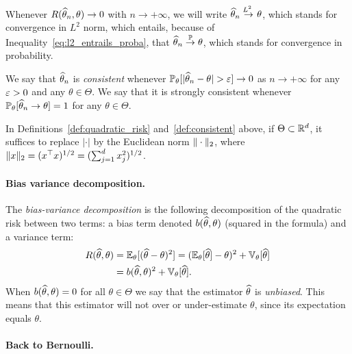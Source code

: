 Whenever $R(\widehat \theta_n, \theta) \rightarrow 0$ with $n \rightarrow +\infty$, we will write $\widehat \theta_n \overset{\text{$L^2$\ }}{\rightarrow} \theta$, which stands for convergence in $L^2$ norm, which entails, because of Inequality~\eqref{eq:l2_entrails_proba}, that $\widehat \theta_n \overset{\mathbb P}{\rightarrow} \theta$, which stands for convergence in probability.%
\begin{definition}
	\label{def:consistent}
	We say that $\widehat \theta_n$ is \emph{consistent} whenever $\mathbb P_\theta[|\widehat \theta_n - \theta| > \varepsilon] \rightarrow 0$ as $n \rightarrow +\infty$ for any $\varepsilon > 0$ and any $\theta \in \Theta$.
	We say that it is strongly consistent whenever $\mathbb P_\theta[\widehat \theta_n \rightarrow \theta] = 1$ for any $\theta \in \Theta$.
\end{definition}
In Definitions~\ref{def:quadratic_risk} and~\ref{def:consistent} above, if $\Theta \subset \mathbb R^d$, it suffices to replace $|\cdot|$ by the Euclidean norm $\| \cdot \|_2$, where $\| x \|_2 = (x^\top x)^{1/2} = (\sum_{j=1}^d x_j^2)^{1/2}$.

\paragraph{Bias variance decomposition.} %

The \emph{bias-variance decomposition} is the following decomposition of the quadratic risk between two terms: a bias term denoted $b(\widehat \theta, \theta)$ (squared in the formula) and a variance term:
\begin{equation}
	\label{eq:bias-variance-decomposition}
	\begin{split}
	R(\widehat \theta, \theta) &= \mathbb E_\theta[(\widehat \theta - \theta)^2] = (\mathbb E_\theta [\widehat \theta] - \theta)^2 + \mathbb V_\theta[ \widehat \theta ] \\
	&= b(\widehat \theta, \theta)^2 + \mathbb V_\theta [\widehat \theta].		
	\end{split}
\end{equation}
When $b(\widehat \theta, \theta) = 0$ for all $\theta \in \Theta$ we say that the estimator $\widehat \theta$ is \emph{unbiased}.
This means that this estimator will not over or under-estimate $\theta$, since its expectation equals $\theta$.

\paragraph{Back to Bernoulli.} %

